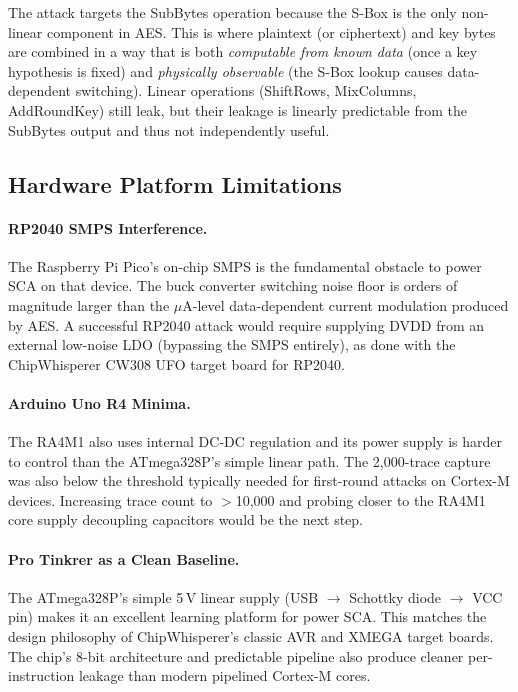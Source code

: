 The attack targets the SubBytes operation because the S-Box is the only
non-linear component in AES.
This is where plaintext (or ciphertext) and key bytes are combined in a way
that is both \emph{computable from known data} (once a key hypothesis is
fixed) and \emph{physically observable} (the S-Box lookup causes data-
dependent switching).
Linear operations (ShiftRows, MixColumns, AddRoundKey) still leak, but their
leakage is linearly predictable from the SubBytes output and thus not
independently useful.

\subsection{Hardware Platform Limitations}
\label{sec:discussion:hw}

\paragraph{RP2040 SMPS Interference.}
The Raspberry Pi Pico's on-chip SMPS is the fundamental obstacle to
power SCA on that device.
The buck converter switching noise floor is orders of magnitude larger than
the $\mu$A-level data-dependent current modulation produced by AES.
A successful RP2040 attack would require supplying DVDD from an external
low-noise LDO (bypassing the SMPS entirely), as done with the ChipWhisperer
CW308 UFO target board for RP2040.

\paragraph{Arduino Uno R4 Minima.}
The RA4M1 also uses internal DC-DC regulation and its power supply is
harder to control than the ATmega328P's simple linear path.
The 2{,}000-trace capture was also below the threshold typically needed
for first-round attacks on Cortex-M devices.
Increasing trace count to $>$10{,}000 and probing closer to the RA4M1
core supply decoupling capacitors would be the next step.

\paragraph{Pro Tinkrer as a Clean Baseline.}
The ATmega328P's simple 5\,V linear supply (USB $\to$ Schottky diode
$\to$ VCC pin) makes it an excellent learning platform for power SCA.
This matches the design philosophy of ChipWhisperer's classic AVR and
XMEGA target boards.
The chip's 8-bit architecture and predictable pipeline also produce
cleaner per-instruction leakage than modern pipelined Cortex-M cores.

